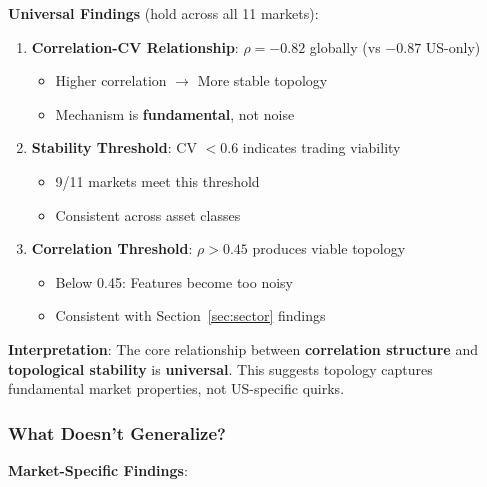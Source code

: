 \textbf{Universal Findings} (hold across all 11 markets):

\begin{enumerate}
\item \textbf{Correlation-CV Relationship}: $\rho = -0.82$ globally (vs $-0.87$ US-only)
   \begin{itemize}
   \item Higher correlation $\rightarrow$ More stable topology
   \item Mechanism is \textbf{fundamental}, not noise
   \end{itemize}

\item \textbf{Stability Threshold}: CV $< 0.6$ indicates trading viability
   \begin{itemize}
   \item 9/11 markets meet this threshold
   \item Consistent across asset classes
   \end{itemize}

\item \textbf{Correlation Threshold}: $\rho > 0.45$ produces viable topology
   \begin{itemize}
   \item Below 0.45: Features become too noisy
   \item Consistent with Section~\ref{sec:sector} findings
   \end{itemize}
\end{enumerate}

\textbf{Interpretation}: The core relationship between \textbf{correlation structure} and \textbf{topological stability} is \textbf{universal}. This suggests topology captures fundamental market properties, not US-specific quirks.

\subsubsection{What Doesn't Generalize?}

\textbf{Market-Specific Findings}:

